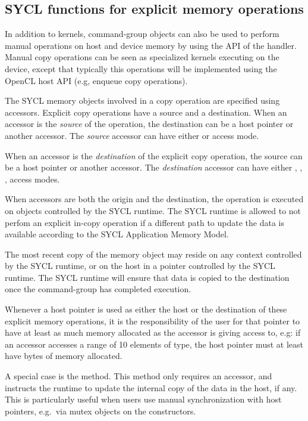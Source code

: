 \subsection{SYCL functions for explicit memory operations}
\label{subsec:explicitmemory}

In addition to \glspl{kernel}, \gls{command-group} objects can also be used to
perform manual operations on host and device memory by using the 
 API of the \gls{handler}.
Manual copy operations can be seen as specialized kernels executing on the 
device, except that typically this operations will be implemented using the
OpenCL host API (e.g, enqueue copy operations).

The SYCL memory objects involved in a copy operation are specified using
accessors.
Explicit copy operations have a source and a destination.
When an accessor is the \textit{source} of the operation, the destination can be 
a host pointer or another accessor.
The \textit{source} accessor can have either  or
 access mode.

When an accessor is the \textit{destination} of the explicit copy operation,
the source can be a host pointer or another accessor.
The \textit{destination} accessor can have either
, , ,
 access modes.

When accessors are both the origin and the destination,
the operation is executed on objects controlled by the SYCL runtime.
The SYCL runtime is allowed to not perfom an explicit in-copy operation
if a different path to update the data is available according to
the SYCL Application Memory Model.

The most recent copy of the memory object may reside on any context controlled
by the SYCL runtime, or on the host in a pointer controlled by the
SYCL runtime.  The SYCL runtime will ensure that data is copied to the destination
once the \gls{command-group} has completed execution.

Whenever a host pointer is used as either the host or the destination of these
explicit memory operations, it is the responsibility
of the user for that pointer to have at least as much memory allocated as
the accessor is giving access to, e.g: if an accessor accesses a range
of 10 elements of  type, the host pointer must at least have 
 bytes of memory allocated.

A special case is the  method. 
This method only requires an accessor, and instructs the runtime to update
the internal copy of the data in the host, if any. This is particularly
useful when users use manual synchronization with host pointers, e.g.\ 
via mutex objects on the  constructors.

